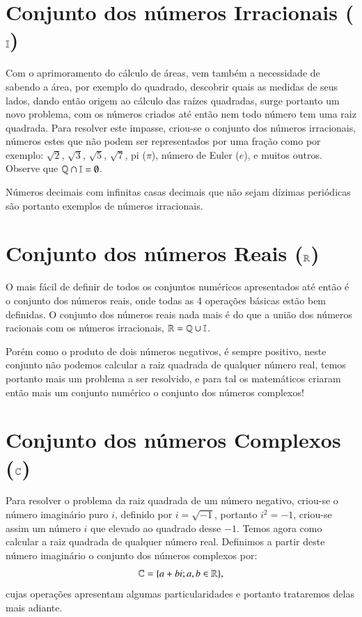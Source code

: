 \section{Conjunto dos números Irracionais (\texorpdfstring{$\mathbb{I}$}{I})}

Com o aprimoramento do cálculo de áreas, vem também a necessidade de sabendo a área, por exemplo do quadrado, descobrir quais as medidas de seus lados, dando então origem ao cálculo das raízes quadradas, surge portanto um novo problema, com os números criados até então nem todo número tem uma raiz quadrada. Para resolver este impasse, criou-se o conjunto dos números irracionais, números estes que não podem ser representados por uma fração como por exemplo: $\sqrt{2}$, $\sqrt{3}$, $\sqrt{5}$, $\sqrt{7}$, pi ($\pi$), número de Euler ($e$), e muitos outros. Observe que $\mathbb{Q} \cap \mathbb{I} = \emptyset$.

Números decimais com infinitas casas decimais que não sejam dízimas periódicas são portanto exemplos de números irracionais.

\section{Conjunto dos números Reais (\texorpdfstring{$\mathbb{R}$}{R})}

O mais fácil de definir de todos os conjuntos numéricos apresentados até então é o conjunto dos números reais, onde todas as 4 operações básicas estão bem definidas. O conjunto dos números reais nada mais é do que a união dos números racionais com os números irracionais, $\mathbb{R}= \mathbb{Q} \cup \mathbb{I}$.

Porém como o produto de dois números negativos, é sempre positivo, neste conjunto não podemos calcular a raiz quadrada de qualquer número real, temos portanto mais um problema a ser resolvido, e para tal os matemáticos criaram então mais um conjunto numérico o conjunto dos números complexos!


\section{Conjunto dos números Complexos (\texorpdfstring{$\mathbb{C}$}{C})}

Para resolver o problema da raiz quadrada de um número negativo, criou-se o número imaginário puro $i$, definido por $i= \sqrt{-1}$, portanto $i^2= -1$, criou-se assim um número $i$ que elevado ao quadrado desse $-1$. Temos agora como calcular a raiz quadrada de qualquer número real. Definimos a partir deste número imaginário o conjunto dos números complexos por:
\[\mathbb{C}= \{a + bi; a, b \in \mathbb{R} \} ,\]
cujas operações apresentam algumas particularidades e portanto trataremos delas mais adiante.

